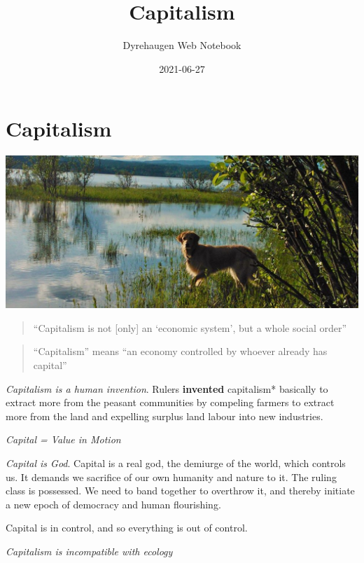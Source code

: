 \documentclass[
]{book}
\title{Capitalism}
\author{Dyrehaugen Web Notebook}
\date{2021-06-27}
\begin{document}
\maketitle

{
\setcounter{tocdepth}{1}
\tableofcontents
}
\hypertarget{capitalism}{%
\chapter{Capitalism}\label{capitalism}}

\includegraphics{fig/zelda.jpg}

\begin{quote}
``Capitalism is not {[}only{]} an `economic system', but a whole social order''
\end{quote}

\begin{quote}
``Capitalism'' means ``an economy controlled by whoever already has capital''
\end{quote}

\emph{Capitalism is a human invention}.
Rulers \textbf{invented} capitalism* basically to
extract more from the peasant communities by compeling farmers to extract more from the land
and expelling surplus land labour into new industries.

\emph{Capital = Value in Motion}

\emph{Capital is God}.
Capital is a real god, the demiurge of the world, which controls us. It demands we sacrifice of our own humanity and nature to it. The ruling class is possessed. We need to band together to overthrow it, and thereby initiate a new epoch of democracy and human flourishing.

Capital is in control, and so everything is out of control.

\emph{Capitalism is incompatible with ecology}
\end{document}
